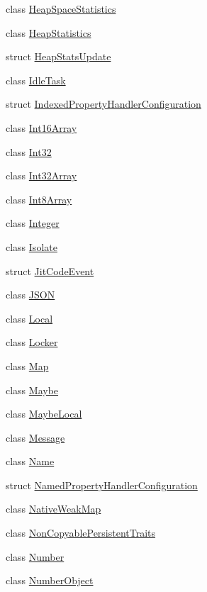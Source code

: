 \begin{DoxyCompactItemize}
\item 
class \hyperlink{classv8_1_1HeapSpaceStatistics}{Heap\+Space\+Statistics}
\item 
class \hyperlink{classv8_1_1HeapStatistics}{Heap\+Statistics}
\item 
struct \hyperlink{structv8_1_1HeapStatsUpdate}{Heap\+Stats\+Update}
\item 
class \hyperlink{classv8_1_1IdleTask}{Idle\+Task}
\item 
struct \hyperlink{structv8_1_1IndexedPropertyHandlerConfiguration}{Indexed\+Property\+Handler\+Configuration}
\item 
class \hyperlink{classv8_1_1Int16Array}{Int16\+Array}
\item 
class \hyperlink{classv8_1_1Int32}{Int32}
\item 
class \hyperlink{classv8_1_1Int32Array}{Int32\+Array}
\item 
class \hyperlink{classv8_1_1Int8Array}{Int8\+Array}
\item 
class \hyperlink{classv8_1_1Integer}{Integer}
\item 
class \hyperlink{classv8_1_1Isolate}{Isolate}
\item 
struct \hyperlink{structv8_1_1JitCodeEvent}{Jit\+Code\+Event}
\item 
class \hyperlink{classv8_1_1JSON}{J\+S\+O\+N}
\item 
class \hyperlink{classv8_1_1Local}{Local}
\item 
class \hyperlink{classv8_1_1Locker}{Locker}
\item 
class \hyperlink{classv8_1_1Map}{Map}
\item 
class \hyperlink{classv8_1_1Maybe}{Maybe}
\item 
class \hyperlink{classv8_1_1MaybeLocal}{Maybe\+Local}
\item 
class \hyperlink{classv8_1_1Message}{Message}
\item 
class \hyperlink{classv8_1_1Name}{Name}
\item 
struct \hyperlink{structv8_1_1NamedPropertyHandlerConfiguration}{Named\+Property\+Handler\+Configuration}
\item 
class \hyperlink{classv8_1_1NativeWeakMap}{Native\+Weak\+Map}
\item 
class \hyperlink{classv8_1_1NonCopyablePersistentTraits}{Non\+Copyable\+Persistent\+Traits}
\item 
class \hyperlink{classv8_1_1Number}{Number}
\item 
class \hyperlink{classv8_1_1NumberObject}{Number\+Object}

\end{DoxyCompactItemize}

